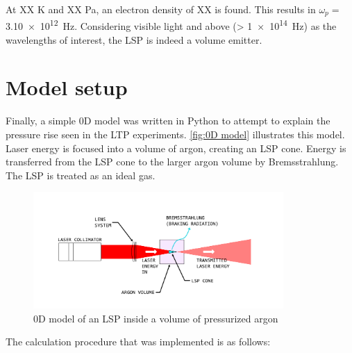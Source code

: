         At  XX K and  XX Pa, an electron density of  XX is found. This results in $\omega_p =$ \qty{3.10e12}{Hz}. Considering visible light and above (> \qty{1e14}{Hz}) as the wavelengths of interest, the LSP is indeed a volume emitter.

    \section{Model setup}
        
        Finally, a simple 0D model was written in Python to attempt to explain the pressure rise seen in the LTP experiments. \autoref{fig:0D model} illustrates this model. Laser energy is focused into a volume of argon, creating an LSP cone. Energy is transferred from the LSP cone to the larger argon volume by Bremsstrahlung.  The LSP is treated as an ideal gas.

        \begin{figure}[!ht]
            \centering
            \includegraphics[width=0.85\textwidth]{assets/2 models/Modeling figure.pdf}
            \caption{0D model of an LSP inside a volume of pressurized argon}
            \label{fig:0D model}
        \end{figure}

        The calculation procedure that was implemented is as follows:


